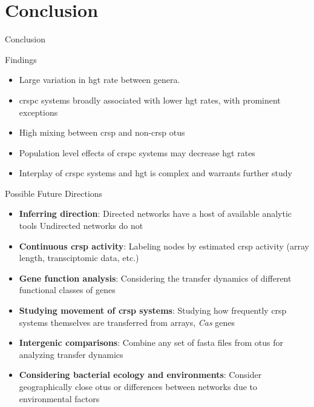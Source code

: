 \documentclass[dvipsnames]{beamer}
\begin{document}
\section*{Conclusion}
\begin{frame}[fragile]{}
    \begin{center}
        \Huge \textcolor{OliveGreen}{Conclusion}
    \end{center}
    \addtocounter{framenumber}{-1}
\end{frame}
\begin{frame}[fragile]{Findings}
    \begin{itemize}
        \item<2-> Large variation in \ac{hgt} rate between genera.
        \item<3-> \ac{crspc} systems broadly associated with lower \ac{hgt} rates, with prominent exceptions
        \item<4-> High mixing between \ac{crsp} and non-\ac{crsp} \ac{otu}s
        \item<5-> Population level effects of \ac{crspc} systems may decrease \ac{hgt} rates
        \item<6-> Interplay of \ac{crspc} systems  and \ac{hgt} is complex and warrants further study
    \end{itemize}
\end{frame}
\begin{frame}[fragile]{Possible Future Directions}
\begin{itemize}
    \item<2-> \textbf{Inferring direction}: Directed networks have a host of available analytic tools Undirected networks do not
    \item<3-> \textbf{Continuous \ac{crsp} activity}: Labeling nodes by estimated \ac{crsp} activity (array length, transciptomic data, etc.)
    \item<4-> \textbf{Gene function analysis}: Considering the transfer dynamics of different functional classes of genes
    \item<5-> \textbf{Studying movement of \ac{crsp} systems}: Studying how frequently \ac{crsp} systems themselves are transferred from arrays, \textit{Cas} genes
    \item<6-> \textbf{Intergenic comparisons}: Combine any set of fasta files from \ac{otu}s for analyzing transfer dynamics
    \item<7-> \textbf{Considering bacterial ecology and environments}: Consider geographically close \ac{otu}s or differences between networks due to environmental factors
\end{itemize}
\end{frame}
\end{document}
